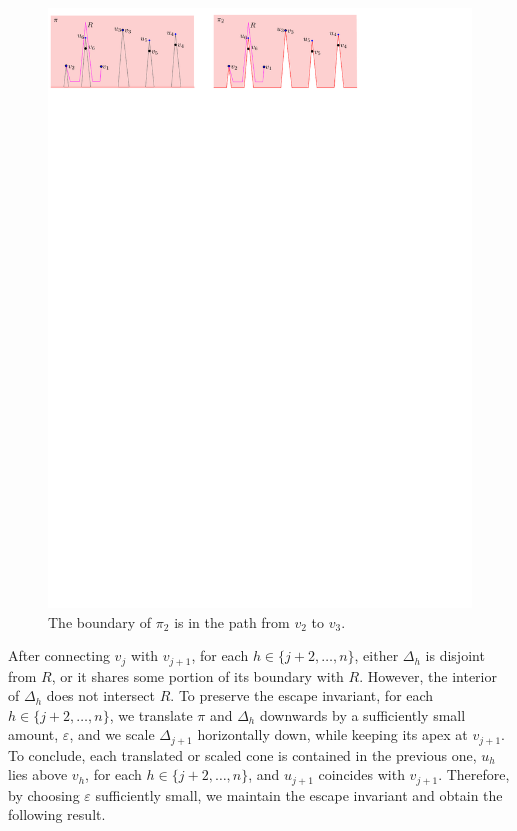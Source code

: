 \documentclass[11pt]{patmorin}
\begin{document}
\begin{figure}[tb]
\centering
\includegraphics[width=.98\textwidth]{img/DentedHalfspace.pdf}
\caption{The boundary of $\pi_2$ is in the path from $v_2$ to $v_3$.}
\label{fig:Dented Halfspace}
\end{figure}

After connecting $v_j$ with $v_{j+1}$, for each $h\in\{j{+}2,\ldots,n\}$, either $\Delta_h$ is disjoint from $R$, or it shares some portion of its boundary with $R$. However, the interior of $\Delta_h$ does not intersect $R$.
To preserve the escape invariant, for each $h\in\{j{+}2,\ldots,n\}$, we translate $\pi$ and $\Delta_h$ downwards by a sufficiently small amount, $\varepsilon$, and we scale $\Delta_{j+1}$ horizontally down, while keeping its apex at $v_{j+1}$. To conclude, each translated or scaled cone is contained in the previous one, $u_h$ lies above $v_h$, for each $h\in\{j+2,\ldots,n\}$, and $u_{j+1}$ coincides with $v_{j+1}$. Therefore, by choosing $\varepsilon$ sufficiently small, we maintain the escape invariant and obtain the following result.
\end{document}
